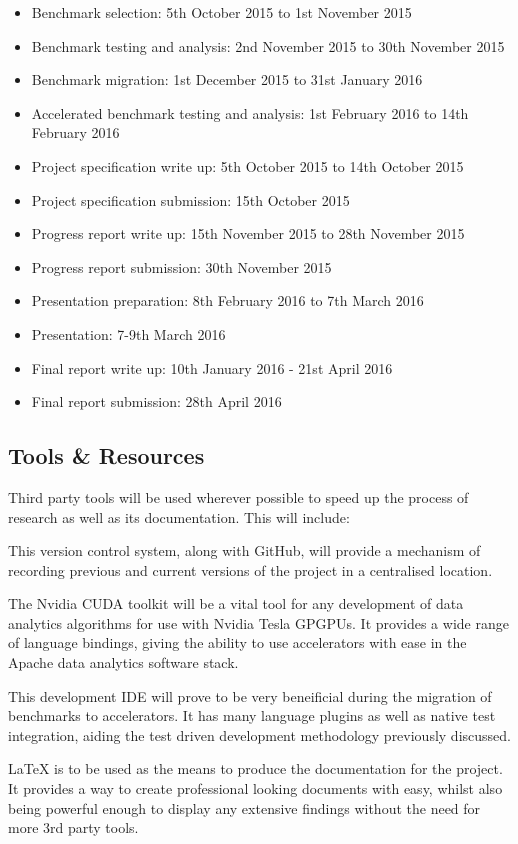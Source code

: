 \documentclass[12pt,a4paper]{article}
\begin{document}
			\begin{itemize}
				\item Benchmark selection: 5th October 2015 to 1st November 2015
				\item Benchmark testing and analysis: 2nd November 2015 to 30th November 2015
				\item Benchmark migration: 1st December 2015 to 31st January 2016
				\item Accelerated benchmark testing and analysis: 1st February 2016 to 14th February 2016
				\item Project specification write up: 5th October 2015 to 14th October 2015
				\item Project specification submission: 15th October 2015
				\item Progress report write up: 15th November 2015 to 28th November 2015
				\item Progress report submission: 30th November 2015
				\item Presentation preparation: 8th February 2016 to 7th March 2016
				\item Presentation: 7-9th March 2016
				\item Final report write up: 10th January 2016 - 21st April 2016
				\item Final report submission: 28th April 2016
			\end{itemize}


		\subsection{Tools \& Resources} %
		\label{sub:tools_resources}
			
			Third party tools will be used wherever possible to speed up the process of research as well as its documentation. This will include:

			\begin{description}[style=nextline]
				\item[\textbf{Git VCS}] This version control system, along with GitHub, will provide a mechanism of recording previous and current versions of the project in a centralised location.
				\item[\textbf{Nvidia CUDA Toolkit}] The Nvidia CUDA toolkit will be a vital tool for any development of data analytics algorithms for use with Nvidia Tesla GPGPUs. It provides a wide range of language bindings, giving the ability to use accelerators with ease in the Apache data analytics software stack.
				\item[\textbf{IntelliJ IDEA}] This development IDE will prove to be very beneificial during the migration of benchmarks to accelerators. It has many language plugins as well as native test integration, aiding the test driven development methodology previously discussed.
				\item[\textbf{LaTeX}] LaTeX is to be used as the means to produce the documentation for the project. It provides a way to create professional looking documents with easy, whilst also being powerful enough to display any extensive findings without the need for more 3rd party tools.
			\end{description}
\end{document}
